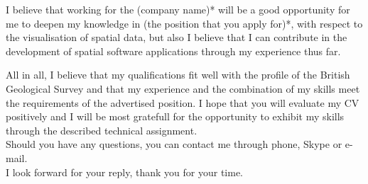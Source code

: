\documentclass[11pt, a4paper]{awesome-cv}
\begin{document}
\begin{cvletter}
I believe that working for the (company name)* will be a good opportunity for me
to deepen my knowledge in (the position that you apply for)*, with respect to the visualisation of
spatial data, but also I believe that I can contribute in the development of spatial software
applications through my experience thus far.

All in all, I believe that my qualifications fit well with the profile of the British Geological
Survey and that my experience and the combination of my skills meet the requirements of
the advertised position. I hope that you will evaluate my CV positively and I will be most
gratefull for the opportunity to exhibit my skills through the described technical assignment.\\
Should you have any questions, you can contact me through phone, Skype or e-mail.\\
I look forward for your reply, thank you for your time.

\end{cvletter}


\makeletterclosing
\end{document}
